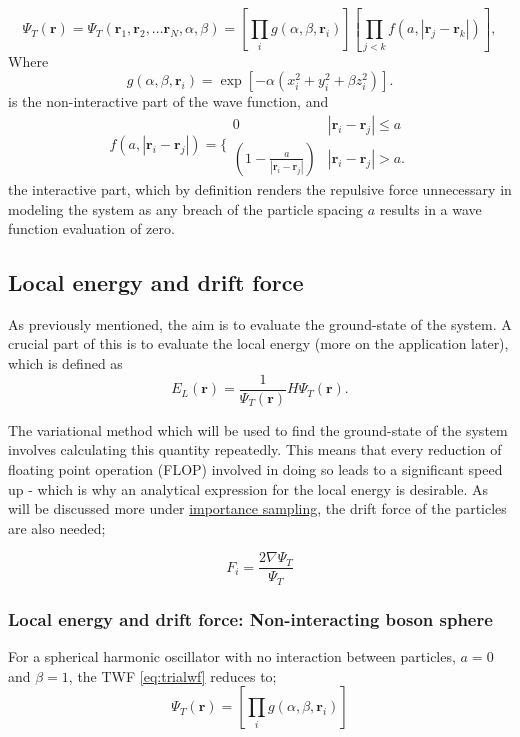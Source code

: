 \documentclass[%
oneside,                 %
final,                   %
10pt]{article}
\begin{document}
\begin{equation}
 \Psi_T(\mathbf{r})=\Psi_T(\mathbf{r}_1, \mathbf{r}_2, \dots \mathbf{r}_N,\alpha,\beta)
 =\left[
    \prod_i g(\alpha,\beta,\mathbf{r}_i)
 \right]
 \left[
    \prod_{j<k}f(a,|\mathbf{r}_j-\mathbf{r}_k|)
 \right],
 \label{eq:trialwf}
\end{equation}
Where
\begin{equation}
    g(\alpha,\beta,\mathbf{r}_i)= \exp{[-\alpha(x_i^2+y_i^2+\beta z_i^2)]}.
 \end{equation}
is the non-interactive part of the wave function, and 
\begin{equation}
    f(a,|\mathbf{r}_i-\mathbf{r}_j|)=\Bigg\{
 \begin{array}{ll}
	 0 & {|\mathbf{r}_i-\mathbf{r}_j|} \leq {a}\\
	 (1-\frac{a}{|\mathbf{r}_i-\mathbf{r}_j|}) & {|\mathbf{r}_i-\mathbf{r}_j|} > {a}.
 \end{array}
 \end{equation}
the interactive part, which by definition renders the repulsive force unnecessary in modeling the system as any breach of the particle spacing $a$ results in a wave function evaluation of zero.


\subsection{Local energy and drift force}
As previously mentioned, the aim is to evaluate the ground-state of the system. A crucial part of this is to evaluate the local energy (more on the application later), which is defined as
\begin{equation}
    E_L(\mathbf{r})=\frac{1}{\Psi_T(\mathbf{r})}H\Psi_T(\mathbf{r}).
    \label{eq:locale}
 \end{equation}
 
The variational method which will be used to find the ground-state of the system involves calculating this quantity repeatedly. This means that every reduction of floating point operation (FLOP) involved in doing so leads to a significant speed up - which is why an analytical expression for the local energy is desirable. As will be discussed more under \hyperref[importance_sampling]{importance sampling}, the drift force of the  particles are also needed;

\begin{equation}
F_i = \frac{2\nabla \Psi_T}{\Psi_T}
\end{equation} 

\subsubsection{Local energy and drift force: Non-interacting boson sphere}
For a spherical harmonic oscillator with no interaction between particles, $a=0$ and $\beta = 1$, the TWF \eqref{eq:trialwf} reduces to;
\begin{equation}
\Psi_T (\bm r)= \left[
    \prod_i g(\alpha,\beta,\mathbf{r}_i)
 \right]
\end{equation}
\end{document}
